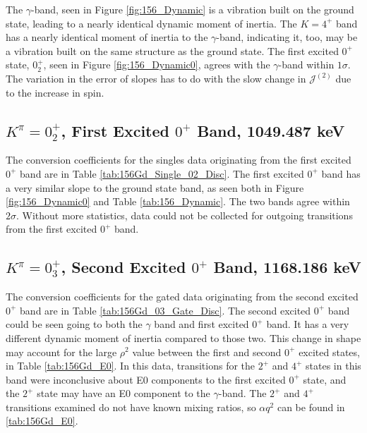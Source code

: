 

The $\gamma$-band, seen in Figure \ref{fig:156_Dynamic} is a vibration built on the ground state, leading to a nearly identical dynamic moment of inertia. The $K=4^+$ band has a nearly identical moment of inertia to the $\gamma$-band, indicating it, too, may be a vibration built on the same structure as the ground state. The first excited $0^+$ state, $0^+_2$, seen in Figure \ref{fig:156_Dynamic0}, agrees with the $\gamma$-band within $1\sigma$. The variation in the error of slopes has to do with the slow change in $\mathcal{J}^{(2)}$ due to the increase in spin. 

\subsection{$K^{\pi}=0^+_2$, First Excited $0^+$ Band, 1049.487 keV}

The conversion coefficients for the singles data originating from the first excited $0^+$ band are in Table \ref{tab:156Gd_Single_02_Disc}. The first excited $0^+$ band has a very similar slope to the ground state band, as seen both in Figure \ref{fig:156_Dynamic0} and Table \ref{tab:156_Dynamic}. The two bands agree within $2\sigma$. Without more statistics, data could not be collected for outgoing transitions from the first excited $0^+$ band.



\subsection{$K^{\pi}=0^+_3$, Second Excited $0^+$ Band, 1168.186 keV}

The conversion coefficients for the gated data originating from the second excited $0^+$ band are in Table \ref{tab:156Gd_03_Gate_Disc}. The second excited $0^+$ band could be seen going to both the $\gamma$ band and first excited $0^+$ band. It has a very different dynamic moment of inertia compared to those two. This change in shape may account for the large $\rho^2$ value between the first and second $0^+$ excited states, in Table \ref{tab:156Gd_E0}. In this data, transitions for the $2^+$ and $4^+$ states in this band were inconclusive about E0 components to the first excited $0^+$ state, and the $2^+$ state may have an E0 component to the $\gamma$-band. The $2^+$ and $4^+$ transitions examined do not have known mixing ratios, so $\alpha q^2$ can be found in \ref{tab:156Gd_E0}.


